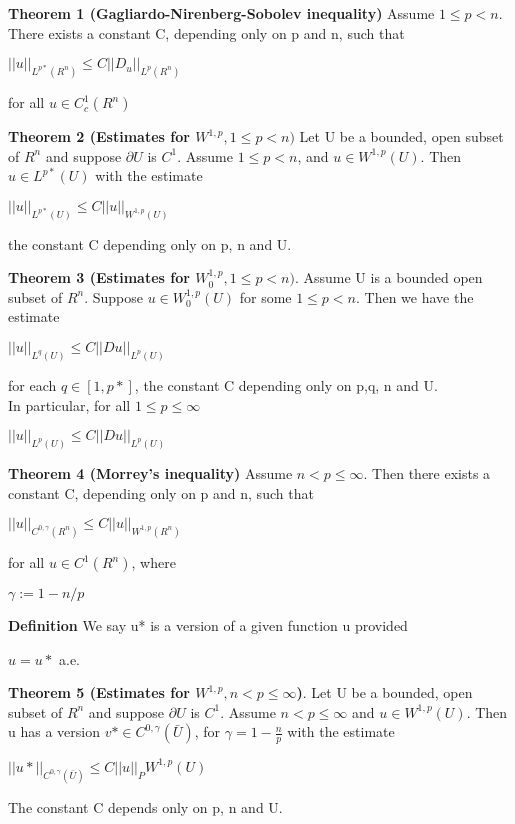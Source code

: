 \documentclass{article}
\begin{document}
\textbf {Theorem 1 (Gagliardo-Nirenberg-Sobolev inequality)} Assume $1 \leq p < n$. There exists a constant C, depending only on p and n, such that
 \begin{center}
$||u||_{L^{p*}(R^n)} \leq C||D_u||_{L^{p}(R^n)}$
\end{center}
for all $u \in C_c^1 (R^n)$

\textbf {Theorem 2 (Estimates for $W^{1,p}, 1 \leq p < n)$} Let U be a bounded, open subset of $R^n$ and suppose $\partial U$ is $C^1$. Assume $1 \leq p < n$, and $u \in W^{1,p}(U)$. Then $u \in L^{p*}(U)$ with the estimate 
 \begin{center}
$||u||_{L^{p*}(U)} \leq C ||u||_{W^{1,p} (U)}$
\end{center}
the constant C depending only on p, n and U.

\textbf {Theorem 3 (Estimates for $W_0^{1,p}, 1 \leq p < n)$}. Assume U is a bounded open subset of $R^n$. Suppose $u \in W_0^{1,p} (U)$ for some $1 \leq p < n$. Then we have the estimate
 \begin{center}
$||u||_{L^{q}(U)} \leq C||Du||_{L^{p}(U)}$
\end{center}
for each $q \in [1, p*]$, the constant C depending only on p,q, n and U. \\
In particular, for all $1 \leq p \leq \infty$
 \begin{center}
$||u||_{L^{p}(U)} \leq C ||Du||_{L^{p}(U)}$
\end{center}

\textbf {Theorem 4 (Morrey's inequality)} Assume $n < p \leq \infty$. Then there exists a constant C, depending only on p and n, such that
 \begin{center}
$||u||_{C^{0, \gamma} (R^n)} \leq C||u||_{W^{1,p}(R^n)}$
\end{center}
for all $u \in C^1(R^n)$, where 
 \begin{center}
$\gamma := 1- n/p$
\end{center}

\textbf {Definition} We say u* is a version of a given function u provided 
 \begin{center}
$u = u*$ a.e.
\end{center}

\textbf {Theorem 5 (Estimates for $W^{1,p}, n < p \leq \infty$)}. Let U be a bounded, open subset of $R^n$ and suppose $\partial U$ is $C^1$. Assume $n < p \leq \infty$ and $u \in W^{1,p}(U)$. Then u has a version $v* \in C^{0, \gamma}(\bar{U})$, for $\gamma = 1 - \frac{n}{p}$ with the estimate
 \begin{center}
$||u*||_{C^{0, \gamma}(\bar{U})} \leq C||u||_PW^{1,p}(U)$
\end{center}
The constant C depends only on p, n and U.
\end{document}
